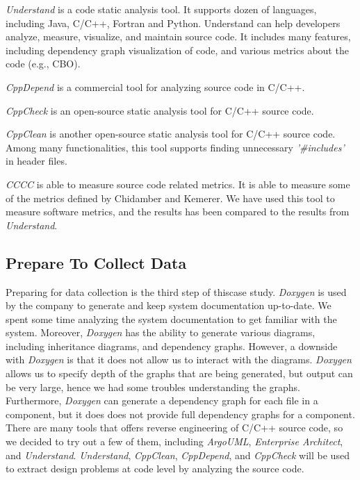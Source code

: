 \textit{Understand}\cite{understnad} is a code static analysis tool. It supports dozen of languages, including Java, C/C++, Fortran and Python. Understand can help developers analyze, measure, visualize, and maintain source code. It includes many features, including dependency graph visualization of code, and various metrics about the code (e.g., CBO).

\textit{CppDepend}\cite{cppdepend} is a commercial tool for analyzing source code in C/C++. 

\textit{CppCheck}\cite{cppcheck} is an open-source static analysis tool for C/C++ source code. 

\textit{CppClean}\cite{cppclean} is another open-source static analysis tool for C/C++ source code. Among many functionalities, this tool supports finding unnecessary \textit{'\#includes'} in header files. 

\textit{CCCC}\cite{cccc} is able to measure source code related metrics. It is able to measure some of the metrics defined by Chidamber and Kemerer\cite{chidamber1994metrics}. We have used this tool to measure software metrics, and the results has been compared to the results from \textit{Understand}.



\subsection{Prepare To Collect Data}
Preparing for data collection is the third step of thiscase study. \textit{Doxygen} is used by the company to generate and keep system documentation up-to-date. We spent some time analyzing the system documentation to get familiar with the system. Moreover, \textit{Doxygen} has the ability to generate various diagrams, including inheritance diagrams, and dependency graphs. However, a downside with \textit{Doxygen} is that it does not allow us to interact with the diagrams. \textit{Doxygen} allows us to specify depth of the graphs that are being generated, but output can be very large, hence we had some troubles understanding the graphs. Furthermore, \textit{Doxygen} can generate a dependency graph for each file in a component, but it does does not provide full dependency graphs for a component. There are many tools that offers reverse engineering of C/C++ source code, so we decided to try out a few of them, including \textit{ArgoUML}, \textit{Enterprise Architect}, and \textit{Understand}. \textit{Understand}, \textit{CppClean}, \textit{CppDepend}, and \textit{CppCheck} will be used to extract design problems at code level by analyzing the source code. 

